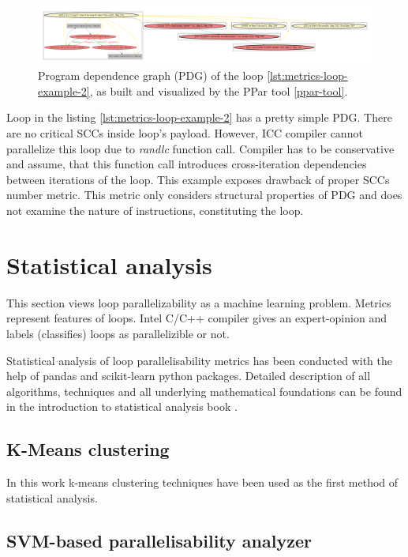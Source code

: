 \begin{figure}[htb]
	\centering
	\includegraphics[width=\linewidth]{figs/metrics-example-loop-2-pdg.pdf}
	\caption{Program dependence graph (PDG) of the loop \ref{lst:metrics-loop-example-2}, as built and visualized by the PPar tool \ref{ppar-tool}.}
	\label{metrics-example-loop-2-pdg}
\end{figure}

\null\qquad Loop in the listing \ref{lst:metrics-loop-example-2} has a pretty simple PDG. There are no critical SCCs inside loop's payload. However, ICC compiler cannot parallelize this loop due to \textit{randlc} function call. Compiler has to be conservative and assume, that this function call introduces cross-iteration dependencies between iterations of the loop.\newline
\null\qquad This example exposes drawback of proper SCCs number metric. This metric only considers structural properties of PDG and does not examine the nature of instructions, constituting the loop. 


\section{Statistical analysis}
\label{analysis-statistical-analysis}
\qquad This section views loop parallelizability as a machine learning problem. Metrics represent features of loops. Intel C/C++ compiler gives an expert-opinion and labels (classifies) loops as parallelizible or not.
   
\qquad Statistical analysis of loop parallelisability metrics has been conducted with the help of pandas \cite{python-lib-pandas} and scikit-learn \cite{python-lib-scikit-learn} python packages. Detailed description of all algorithms, techniques and all underlying mathematical foundations can be found in the introduction to statistical analysis book \cite{statistical-learning-book}.

\subsection{K-Means clustering}

\qquad In this work k-means clustering techniques have been used as the first method of statistical analysis.




\subsection{SVM-based parallelisability analyzer}